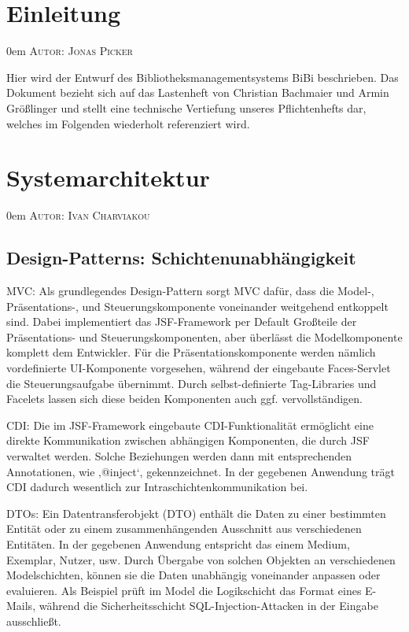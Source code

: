\documentclass{article}
\makeatletter
\newcommand{\sectionauthor}[1]{
	{\parindent 0em \large \scshape Autor: #1 \par \nobreak \vspace*{1em}}
	\@afterheading
}
\makeatother
\begin{document}
\section{Einleitung}
\sectionauthor{Jonas Picker}
Hier wird der Entwurf des Bibliotheksmanagementsystems BiBi beschrieben. Das Dokument bezieht sich auf das Lastenheft von Christian Bachmaier und Armin Größlinger und stellt eine technische Vertiefung unseres Pflichtenhefts dar, welches im Folgenden wiederholt referenziert wird.

\section{Systemarchitektur}
\sectionauthor{Ivan Charviakou}

\subsection{Design-Patterns: Schichtenunabhängigkeit}

MVC: Als grundlegendes Design-Pattern sorgt MVC dafür, dass die Model-, Präsentations-, und Steuerungskomponente voneinander weitgehend entkoppelt sind. Dabei implementiert das JSF-Framework per Default Großteile der Präsentations- und Steuerungskomponenten, aber überlässt die Modelkomponente komplett dem Entwickler. Für die Präsentationskomponente werden nämlich vordefinierte UI-Komponente vorgesehen, während der eingebaute Faces-Servlet die Steuerungsaufgabe übernimmt. Durch selbst-definierte Tag-Libraries und Facelets lassen sich diese beiden Komponenten auch ggf. vervollständigen. \vspace{0.5em}

CDI: Die im JSF-Framework eingebaute CDI-Funktionalität ermöglicht eine direkte Kommunikation zwischen abhängigen Komponenten, die durch JSF verwaltet werden. Solche Beziehungen werden dann mit entsprechenden Annotationen, wie ‚@inject‘, gekennzeichnet. In der gegebenen Anwendung trägt CDI dadurch wesentlich zur Intraschichtenkommunikation bei. \vspace{0.5em}

DTOs: Ein Datentransferobjekt (DTO) enthält die Daten zu einer bestimmten Entität oder zu einem zusammenhängenden Ausschnitt aus verschiedenen Entitäten. In der gegebenen Anwendung entspricht das einem Medium, Exemplar, Nutzer, usw. Durch Übergabe von solchen Objekten an verschiedenen Modelschichten, können sie die Daten unabhängig voneinander anpassen oder evaluieren. Als Beispiel prüft im Model die Logikschicht das Format eines E-Mails, während die Sicherheitsschicht SQL-Injection-Attacken in der Eingabe ausschließt. \vspace{0.5em}
\end{document}
